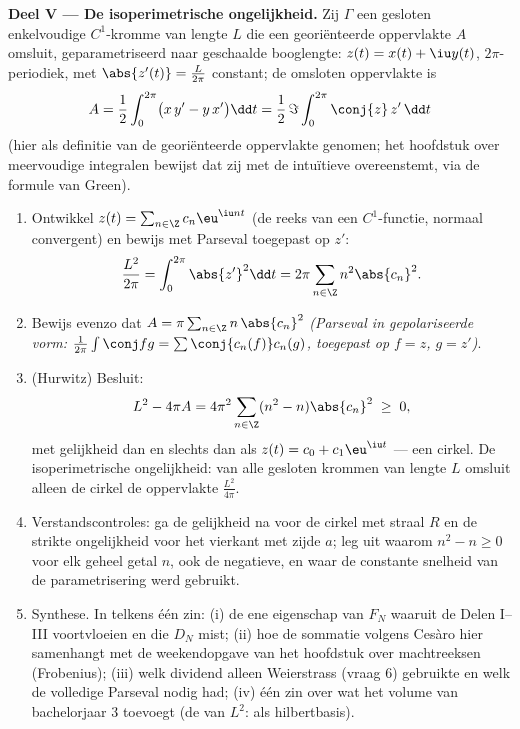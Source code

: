 \begin{problem}
\medskip
\noindent\textbf{Deel V --- De isoperimetrische ongelijkheid.} Zij
$\Gamma$ een gesloten enkelvoudige $C^1$-kromme van lengte $L$ die
een georiënteerde oppervlakte $A$ omsluit, geparametriseerd naar
geschaalde booglengte: $z(t) = x(t) + \iu y(t)$, $2\pi$-periodiek,
met $\abs{z'(t)} = \frac{L}{2\pi}$ constant; de omsloten
oppervlakte is
\[
A = \frac12\int_0^{2\pi}\bigl(x\,y' - y\,x'\bigr)\dd t
= \frac{1}{2}\,\Im\int_0^{2\pi}\conj{z}\,z'\,\dd t
\]
(hier als definitie van de georiënteerde oppervlakte genomen; het
hoofdstuk over meervoudige integralen bewijst dat zij met de
intuïtieve overeenstemt, via de formule van Green).
\begin{enumerate}[resume]
  \item Ontwikkel $z(t) = \sum_{n\in\Z}c_n\eu^{\iu nt}$ (de reeks
        van een $C^1$-functie, normaal convergent) en bewijs met
        Parseval toegepast op $z'$:
        \[
        \frac{L^2}{2\pi} = \int_0^{2\pi}\abs{z'}^2\dd t
        = 2\pi\sum_{n\in\Z}n^2\abs{c_n}^2 .
        \]
  \item Bewijs evenzo dat $A = \pi\sum_{n\in\Z} n\,\abs{c_n}^2$
        \emph{(Parseval in gepolariseerde vorm:
        $\frac{1}{2\pi}\int\conj f g = \sum \conj{c_n(f)}c_n(g)$,
        toegepast op $f = z$, $g = z'$)}.
  \item (Hurwitz) Besluit:
        \[
        L^2 - 4\pi A = 4\pi^2\sum_{n\in\Z}
        (n^2 - n)\abs{c_n}^2 \;\geq\; 0 ,
        \]
        met gelijkheid dan en slechts dan als $z(t) = c_0 +
        c_1\eu^{\iu t}$ --- een cirkel. De isoperimetrische
        ongelijkheid: van alle gesloten krommen van lengte $L$
        omsluit alleen de cirkel de oppervlakte
        $\frac{L^2}{4\pi}$.
  \item Verstandscontroles: ga de gelijkheid na voor de cirkel met
        straal $R$ en de strikte ongelijkheid voor het vierkant
        met zijde $a$; leg uit waarom $n^2 - n \geq 0$ voor elk
        geheel getal $n$, ook de negatieve, en waar de constante
        snelheid van de parametrisering werd gebruikt.
  \item Synthese. In telkens één zin: (i) de ene eigenschap van
        $F_N$ waaruit de Delen I--III voortvloeien en die $D_N$
        mist; (ii) hoe de sommatie volgens Cesàro hier samenhangt
        met de weekendopgave van het hoofdstuk over machtreeksen
        (Frobenius); (iii) welk dividend alleen Weierstrass (vraag
        6) gebruikte en welk de volledige Parseval nodig had; (iv)
        één zin over wat het volume van bachelorjaar 3 toevoegt
        (de  van $L^2$:  als
        hilbertbasis).
\end{enumerate}
\end{problem}
